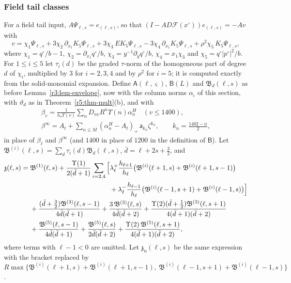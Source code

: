 \documentclass[11pt]{amsart}
\theoremstyle{definition}
\theoremstyle{remark}
\numberwithin{equation}{section}
\newcommand{\Fc}{\mathcal{F}}
\begin{document}
\subsubsection*{Field tail classes}
For a field tail input, $A\Psi_{\ell,s}=e_{(\ell,s)}$, so that $(I-AD\Fc(x^\circ))e_{(\ell,s)}=-Av$ with
\[
v=\chi_1\Psi_{\ell,s}+3\chi_2\,\partial_{x_1}K_5\Psi_{\ell,s}+3\chi_3\,EK_5\Psi_{\ell,s}-3\chi_4\,\partial_{x_1}K_5\Psi_{\ell,s}+\rho^2\chi_5\,K_5\Psi_{\ell,s},
\]
where $\chi_1=q^\circ/b-1$, $\chi_2=\partial_{x_1}q^\circ/b$, $\chi_3=y^{-1}\partial_yq^\circ/b$, $\chi_4=x_1\chi_3$ and $\chi_5=q^\circ|p^\circ|^2/b$. For $1\leq i\leq5$ let $\tau_i(d)$ be the graded $\tau$-norm of the homogeneous part of degree $d$ of $\chi_i$, multiplied by $3$ for $i=2,3,4$ and by $\rho^2$ for $i=5$; it is computed exactly from the solid-monomial expansion. Define $\mathsf A(\ell,\varsigma)$, $\mathsf B(L)$ and $\mathfrak B_d(\ell,s)$ as before Lemma~\ref{r3:lem-envelope}, now with the column norms $\alpha_\iota$ of this section, with $\vartheta_d$ as in Theorem~\ref{r5:thm-mult}(b), and with
\begin{gather*}
\beta_v=\frac1{h_v\Upsilon(v)}\sum_nD_{nv}R^n\Upsilon(n)\alpha^H_n\quad(v\leq1400),\\
\beta^\infty=A_t+\sum_{n\leq M}(\alpha^H_n-A_t)_+\,\mathsf a_{k_n}\zeta^{k_n},\qquad k_n=\frac{1402-n}2,
\end{gather*}
in place of $\beta_\ell$ and $\beta^\infty$ (and $1400$ in place of $1200$ in the definition of $\mathsf B$). Let $\mathfrak B^{(i)}(\ell,s)=\sum_d\tau_i(d)\mathfrak B_d(\ell,s)$, $\bar d=\ell+2s+\frac32$, and
\begin{align*}
\mathfrak z(\ell,s)={}&\mathfrak B^{(1)}(\ell,s)+\frac{\Upsilon(1)}{2(\bar d+1)}\sum_{i=2,4}\Big[\lambda^+_\ell\frac{h_{\ell+1}}{h_\ell}\big(\mathfrak B^{(i)}(\ell+1,s)+\mathfrak B^{(i)}(\ell+1,s-1)\big)\\
&\hphantom{\mathfrak B^{(1)}(\ell,s)+\frac{\Upsilon(1)}{2(\bar d+1)}\sum_{i=2,4}\Big[}+\lambda^-_\ell\frac{h_{\ell-1}}{h_\ell}\big(\mathfrak B^{(i)}(\ell-1,s+1)+\mathfrak B^{(i)}(\ell-1,s)\big)\Big]\\
&+\frac{(\bar d+\frac32)\mathfrak B^{(3)}(\ell,s-1)}{4\bar d(\bar d+1)}+\frac{3\,\mathfrak B^{(3)}(\ell,s)}{4\bar d(\bar d+2)}+\frac{\Upsilon(2)(\bar d+\frac12)\mathfrak B^{(3)}(\ell,s+1)}{4(\bar d+1)(\bar d+2)}\\
&+\frac{\mathfrak B^{(5)}(\ell,s-1)}{4\bar d(\bar d+1)}+\frac{\mathfrak B^{(5)}(\ell,s)}{2\bar d(\bar d+2)}+\frac{\Upsilon(2)\,\mathfrak B^{(5)}(\ell,s+1)}{4(\bar d+1)(\bar d+2)},
\end{align*}
where terms with $\ell-1<0$ are omitted. Let $\mathfrak z_{\mathrm u}(\ell,s)$ be the same expression with the bracket replaced by $R\max\{\mathfrak B^{(i)}(\ell+1,s)+\mathfrak B^{(i)}(\ell+1,s-1),\ \mathfrak B^{(i)}(\ell-1,s+1)+\mathfrak B^{(i)}(\ell-1,s)\}$.
\end{document}
